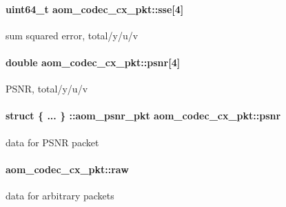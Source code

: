 \paragraph[{\texorpdfstring{sse}{sse}}]{\setlength{\rightskip}{0pt plus 5cm}uint64\+\_\+t aom\+\_\+codec\+\_\+cx\+\_\+pkt\+::sse\mbox{[}4\mbox{]}}\hypertarget{structaom__codec__cx__pkt_afe2d06d74e3fae7d04fdde4e7d1ae455}{}\label{structaom__codec__cx__pkt_afe2d06d74e3fae7d04fdde4e7d1ae455}
sum squared error, total/y/u/v 
\paragraph[{\texorpdfstring{psnr}{psnr}}]{\setlength{\rightskip}{0pt plus 5cm}double aom\+\_\+codec\+\_\+cx\+\_\+pkt\+::psnr\mbox{[}4\mbox{]}}\hypertarget{structaom__codec__cx__pkt_a3a38e942aa0da463260a05eb05f51762}{}\label{structaom__codec__cx__pkt_a3a38e942aa0da463260a05eb05f51762}
P\+S\+NR, total/y/u/v 
\paragraph[{\texorpdfstring{psnr}{psnr}}]{\setlength{\rightskip}{0pt plus 5cm}struct \{ ... \} \+::aom\+\_\+psnr\+\_\+pkt  aom\+\_\+codec\+\_\+cx\+\_\+pkt\+::psnr}\hypertarget{structaom__codec__cx__pkt_a95d437114a001414f864e086ca6ab152}{}\label{structaom__codec__cx__pkt_a95d437114a001414f864e086ca6ab152}
data for P\+S\+NR packet 
\paragraph[{\texorpdfstring{raw}{raw}}]{ aom\+\_\+codec\+\_\+cx\+\_\+pkt\+::raw}\hypertarget{structaom__codec__cx__pkt_a4fc6ea5e240c5df0acbf77aa2fe5ec6f}{}\label{structaom__codec__cx__pkt_a4fc6ea5e240c5df0acbf77aa2fe5ec6f}
data for arbitrary packets 
